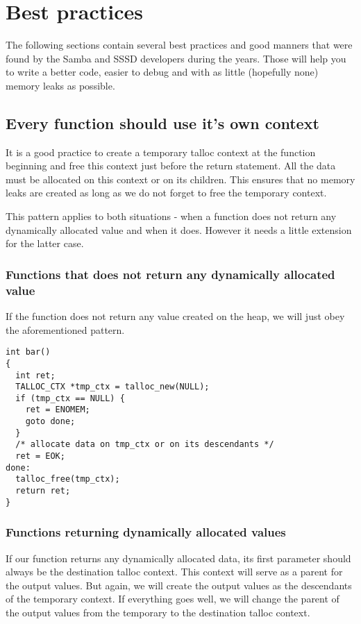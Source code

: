 \section{Best practices}
\label{talloc:sec:best-practices}

The following sections contain several best practices and good manners that were
found by the Samba and SSSD developers during the years. Those will help you to
write a better code, easier to debug and with as little (hopefully none) memory
leaks as possible.

\subsection{Every function should use it's own context}
\label{talloc:subsec:function-use-own-context}

It is a good practice to create a temporary talloc context at the function
beginning and free this context just before the return statement. All the data
must be allocated on this context or on its children. This ensures that no
memory leaks are created as long as we do not forget to free the temporary
context.

This pattern applies to both situations - when a function does not return any
dynamically allocated value and when it does. However it needs a little
extension for the latter case.

\subsubsection{Functions that does not return any dynamically allocated value}

If the function does not return any value created on the heap, we will just obey
the aforementioned pattern.

\begin{lstlisting}[caption={Temporary context \#1},label=lst:tmp-ctx-1]
int bar()
{
  int ret;
  TALLOC_CTX *tmp_ctx = talloc_new(NULL);
  if (tmp_ctx == NULL) {
    ret = ENOMEM;
    goto done;
  }
  /* allocate data on tmp_ctx or on its descendants */
  ret = EOK;
done:
  talloc_free(tmp_ctx);
  return ret;
}
\end{lstlisting}

\subsubsection{Functions returning dynamically allocated values}

If our function returns any dynamically allocated data, its first parameter
should always be the destination talloc context. This context will serve
as a parent for the output values. But again, we will create the output values
as the descendants of the temporary context. If everything goes well, we will
change the parent of the output values from the temporary to the destination
talloc context.

